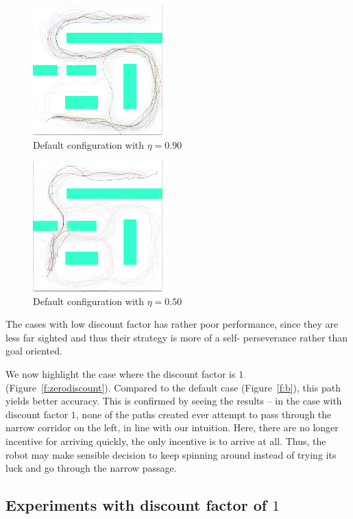 \documentclass[a4paper]{article}
\begin{document}
\begin{figure}
\caption{Default configuration with $\eta=0.90$}
\centerline{\includegraphics[width=5cm]{b_lowdiscount.png}}
\end{figure}

\begin{figure}
\caption{Default configuration with $\eta=0.50$}
\label{f:b_verylowdiscount}
\centerline{\includegraphics[width=5cm]{b_verylowdiscount.png}}
\end{figure}

The cases with low discount factor has rather poor performance, since
they are less far sighted and thus their strategy is more of a self-
perseverance rather than goal oriented.

We now highlight the case where the discount factor is $1$ (Figure~\ref{f:zerodiscount}). Compared to the default case (Figure~\ref{f:b}), this path
yields better accuracy. This is confirmed by seeing the results -- in the
case with discount factor $1$, none of the paths created ever attempt to
pass through the narrow corridor on the left, in line with our intuition.
Here, there are no longer incentive for arriving quickly, the only
incentive is to arrive at all. Thus, the robot may make sensible decision
to keep spinning around instead of trying its luck and go through the narrow
passage.

\subsection{Experiments with discount factor of $1$}
\label{s:ideal}
\end{document}
